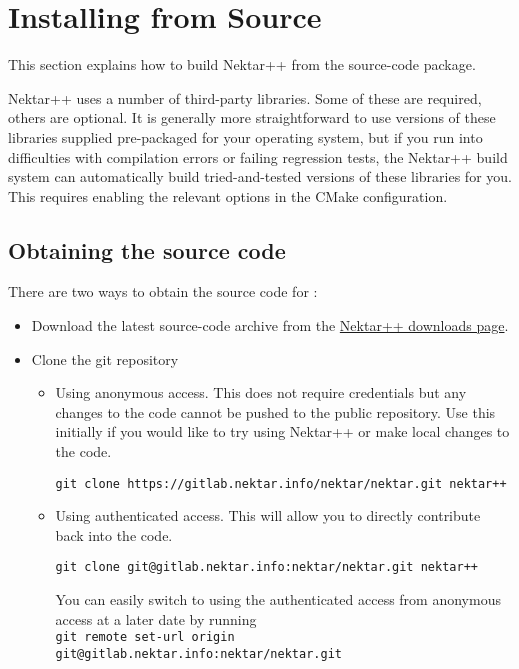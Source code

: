 \section{Installing from Source}
\label{s:installation:source}

This section explains how to build Nektar++ from the source-code package.

Nektar++ uses a number of third-party libraries. Some of these are required,
others are optional. It is generally more straightforward to use versions of
these libraries supplied pre-packaged for your operating system, but if you run
into difficulties with compilation errors or failing regression tests, the
Nektar++ build system can automatically build tried-and-tested versions of these
libraries for you. This requires enabling the relevant options in the CMake
configuration.


\subsection{Obtaining the source code}
There are two ways to obtain the source code for \nekpp:
\begin{itemize}
	\item Download the latest source-code archive from the
	\href{http://www.nektar.info/downloads}{Nektar++ downloads page}.
	\item Clone the git repository
	\begin{itemize}
	\item Using anonymous access. This does not require
	credentials but any changes to the code cannot be pushed to the
	public repository. Use this initially if you would like to try using
	Nektar++ or make local changes to the code.
    \begin{lstlisting}[style=BashInputStyle]
        git clone https://gitlab.nektar.info/nektar/nektar.git nektar++
    \end{lstlisting}
	\item Using authenticated access. This will allow you to directly contribute
	back into the code.
    \begin{lstlisting}[style=BashInputStyle]
        git clone git@gitlab.nektar.info:nektar/nektar.git nektar++
    \end{lstlisting}
    \begin{tipbox}
    You can easily switch to using the authenticated access from anonymous
    access at a later date by running\\
    \footnotesize\texttt{git remote set-url origin git@gitlab.nektar.info:nektar/nektar.git}
    \end{tipbox}
	\end{itemize}
\end{itemize}

